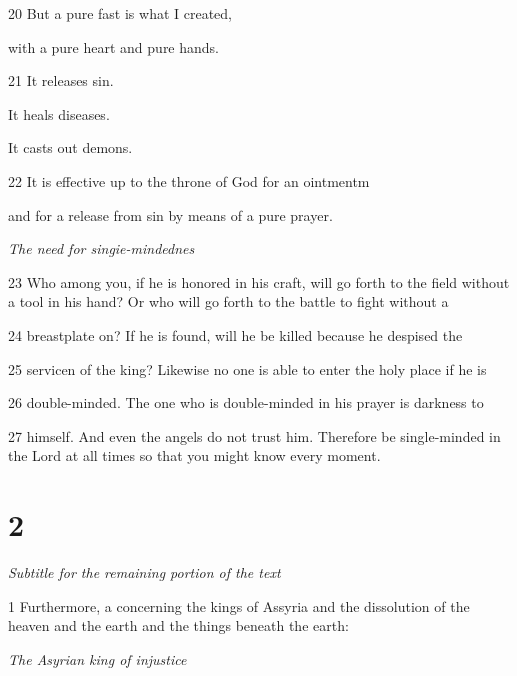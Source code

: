 \par 20 But a pure fast is what I created,

\par with a pure heart and pure hands.

\par 21 It releases sin.

\par It heals diseases.

\par It casts out demons.

\par 22 It is effective up to the throne of God for an ointmentm

\par and for a release from sin by means of a pure prayer.

\par \textit{The need for singie-mindednes}

\par 23 Who among you, if he is honored in his craft, will go forth to the field without a tool in his hand? Or who will go forth to the battle to fight without a 

\par 24 breastplate on? If he is found, will he be killed because he despised the

\par 25 servicen of the king? Likewise no one is able to enter the holy place if he is

\par 26 double-minded. The one who is double-minded in his prayer is darkness to

\par 27 himself. And even the angels do not trust him. Therefore be single-minded in the Lord at all times so that you might know every moment.

\chapter{2}

\par \textit{Subtitle for the remaining portion of the text}

\par 1 Furthermore, a concerning the kings of Assyria and the dissolution of the heaven and the earth and the things beneath the earth:

\par \textit{The Asyrian king of injustice}


